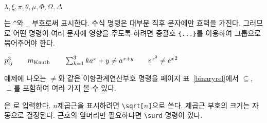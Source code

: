 \begin{example}
$\lambda,\xi,\pi,\theta,
 \mu,\Phi,\Omega,\Delta$
\end{example}

%
는 \verb|^|와 \verb|_| 부호로써 표시한다.
수식 명령은 대부분 직후 문자에만 효력을 가진다. 그러므로 어떤 명령이 여러 문자에 영향을 주도록 하려면 
중괄호 \verb|{...}|를 이용하여 그룹으로 묶어주어야 한다.


\begin{example}
$p^3_{ij} \qquad 
 m_\text{Knuth}\qquad
\sum_{k=1}^3 k \\[5pt]
 a^x+y \neq a^{x+y}\qquad 
 e^{x^2} \neq {e^x}^2$
\end{example}
\noindent 예제에 나오는 $\neq$와 같은 이항관계연산부호 명령을 
\pageref{binaryrel}페이지 표~\ref{binaryrel}에서 $\subseteq$, $\perp$를 포함하여 여러 가지 볼 수 있다.


은 로 입력한다.
$n$제곱근을 표시하려면 \verb|\sqrt[|$n$\verb|]|으로 쓴다. 제곱근 부호의 크기는 자동으로 결정된다.
근호의 앞머리만 필요하다면 \verb|\surd| 명령이 있다.

